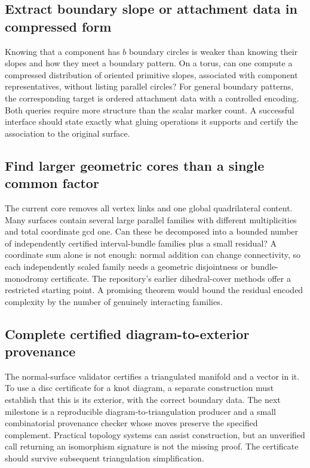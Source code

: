 \subsection{Extract boundary slope or attachment data in compressed form}

Knowing that a component has $b$ boundary circles is weaker than knowing
their slopes and how they meet a boundary pattern. On a torus, can one
compute a compressed distribution of oriented primitive slopes, associated
with component representatives, without listing parallel circles? For
general boundary patterns, the corresponding target is ordered attachment
data with a controlled encoding. Both queries require more structure than
the scalar marker count. A successful interface should state exactly what
gluing operations it supports and certify the association to the original
surface.

\subsection{Find larger geometric cores than a single common factor}

The current core removes all vertex links and one global quadrilateral
content. Many surfaces contain several large parallel families with
different multiplicities and total coordinate gcd one. Can these be
decomposed into a bounded number of independently certified interval-bundle
families plus a small residual? A coordinate sum alone is not enough:
normal addition can change connectivity, so each independently scaled
family needs a geometric disjointness or bundle-monodromy certificate.
The repository's earlier dihedral-cover methods offer a restricted
starting point. A promising theorem would bound the residual encoded
complexity by the number of genuinely interacting families.

\subsection{Complete certified diagram-to-exterior provenance}

The normal-surface validator certifies a triangulated manifold and a vector
in it. To use a disc certificate for a knot diagram, a separate construction
must establish that this is its exterior, with the correct boundary data.
The next milestone is a reproducible diagram-to-triangulation producer and
a small combinatorial provenance checker whose moves preserve the specified
complement. Practical topology systems can assist construction, but an
unverified call returning an isomorphism signature is not the missing
proof. The certificate should survive subsequent triangulation simplification.

